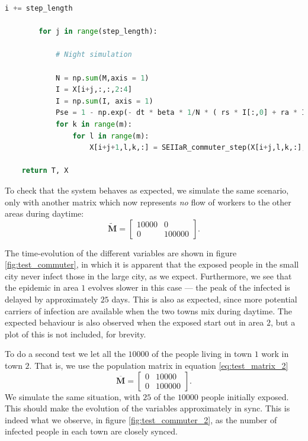 \begin{lstlisting}[language=Python,label={lst:commuter},caption={SEIIaR commuter algorithm implemented in python}]
        i += step_length

        for j in range(step_length):

            # Night simulation 
            
            N = np.sum(M,axis = 1)
            I = X[i+j,:,:,2:4]
            I = np.sum(I, axis = 1)
            Pse = 1 - np.exp(- dt * beta * 1/N * ( rs * I[:,0] + ra * I[:,1] ))
            for k in range(m):
                for l in range(m):
                    X[i+j+1,l,k,:] = SEIIaR_commuter_step(X[i+j,l,k,:],Pse[k],Pei,Peia,Pir,Piar)

    return T, X
\end{lstlisting}

To check that the system behaves as expected, we simulate the same scenario, only with another matrix which now represents \textit{no} flow of workers to the other areas during daytime:
\begin{equation}\label{eq:test_matrix}
	\mathbf{\widetilde{M}} = \begin{bmatrix}
		10000 & 0 \\
		0 & 100000 
	\end{bmatrix}.
\end{equation}

The time-evolution of the different variables are shown in figure \ref{fig:test_commuter}, in which it is apparent that the exposed people in the small city never infect those in the large city, as we expect. Furthermore, we see that the epidemic in area $1$ evolves slower in this case --- the peak of the infected is delayed by approximately $25$ days. This is also as expected, since more potential carriers of infection are available when the two towns mix during daytime. The expected behaviour is also observed when the exposed start out in area $2$, but a plot of this is not included, for brevity. 

To do a second test we let all the $10000$ of the people living in town $1$ work in town $2$. That is, we use the population matrix in equation \eqref{eq:test_matrix_2}
\begin{equation}\label{eq:test_matrix_2}
	\mathbf{\overline{M}} = \begin{bmatrix}
		0 & 10000 \\
		0 & 100000 
	\end{bmatrix}.
\end{equation}
We simulate the same situation, with $25$ of the $10000$ people initially exposed. This should make the evolution of the variables approximately in sync. This is indeed what we observe, in figure \ref{fig:test_commuter_2}, as the number of infected people in each town are closely synced.

